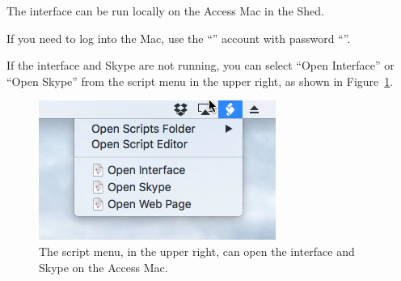 The interface can be run locally on the Access Mac in the Shed.

If you need to log into the Mac, use the “{\projectaccount}” account with password “{\projectaccount}”.

If the interface and Skype are not running, you can select “Open Interface” or “Open Skype” from the script menu in the upper right, as shown in Figure~\ref{figure:interface-scripts-menu}.

\begin{figure}
\begin{center}
\includegraphics[width=0.4\linewidth]{figures/interface-scripts-menu.png}
\end{center}
\caption{The script menu, in the upper right, can open the interface and Skype on the Access Mac.}
\label{figure:interface-scripts-menu}
\end{figure}
